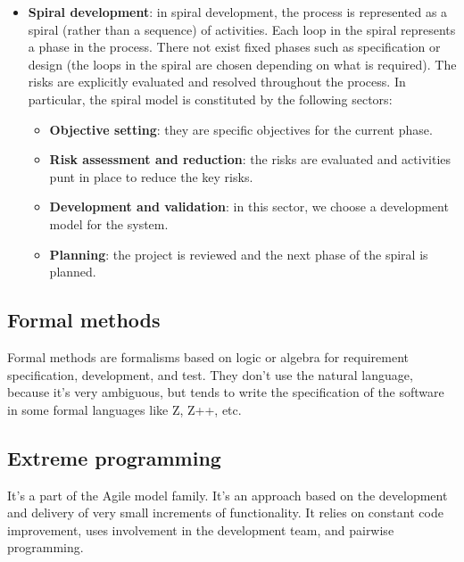 \begin{itemize}
    \item \textbf{Spiral development}: in spiral development, the process is represented as a spiral (rather than a sequence) of activities. Each loop in the spiral represents a phase in the process. There not exist fixed phases such as specification or design (the loops in the spiral are chosen depending on what is required). The risks are explicitly evaluated and resolved throughout the process. In particular, the spiral model is constituted by the following sectors:
          \begin{itemize}
              \item \textbf{Objective setting}: they are specific objectives for the current phase.
              \item \textbf{Risk assessment and reduction}: the risks are evaluated and activities punt in place to reduce the key risks.
              \item \textbf{Development and validation}: in this sector, we choose a development model for the system.
              \item \textbf{Planning}: the project is reviewed and the next phase of the spiral is planned.
          \end{itemize}
\end{itemize}

\subsection{Formal methods}
Formal methods are formalisms based on logic or algebra for requirement specification, development, and test.
They don't use the natural language, because it's very ambiguous, but tends to write the specification of the software in some formal languages like Z, Z++, etc.

\subsection{Extreme programming}
It's a part of the Agile model family.
It's an approach based on the development and delivery of very small increments of functionality.
It relies on constant code improvement, uses involvement in the development team, and pairwise programming.


